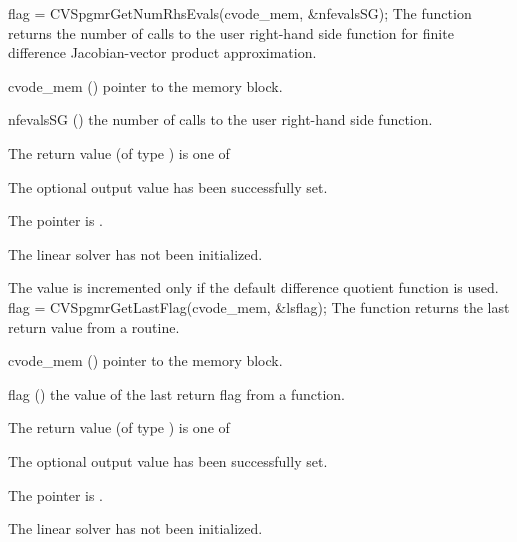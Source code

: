 {}
{
  flag = CVSpgmrGetNumRhsEvals(cvode\_mem, \&nfevalsSG);
}
{
  The function  returns the
  number of calls to the user right-hand side function for
  finite difference Jacobian-vector product approximation.
}
{
  \begin{args}
  \item[cvode\_mem] ()
    pointer to the {\cvode} memory block.
  \item[nfevalsSG] ()
    the number of calls to the user right-hand side function.
  \end{args}
}
{
  The return value  (of type ) is one of
  \begin{args}
  \item[\Id{CVSPGMR\_SUCCESS}] 
    The optional output value has been successfully set.
  \item[\Id{CVSPGMR\_MEM\_NULL}]
    The  pointer is .
  \item[\Id{CVSPGMR\_LMEM\_NULL}]
    The {\cvspgmr} linear solver has not been initialized.
  \end{args}
}
{
  The value  is incremented only if the default 
   difference quotient function is used.
}
{
  flag = CVSpgmrGetLastFlag(cvode\_mem, \&lsflag);
}
{
  The function  returns the
  last return value from a {\cvspgmr} routine. 
}
{
  \begin{args}
  \item[cvode\_mem] ()
    pointer to the {\cvode} memory block.
  \item[flag] ()
    the value of the last return flag from a {\cvspgmr} function.
  \end{args}
}
{
  The return value  (of type ) is one of
  \begin{args}
  \item[\Id{CVSPGMR\_SUCCESS}] 
    The optional output value has been successfully set.
  \item[\Id{CVSPGMR\_MEM\_NULL}]
    The  pointer is .
  \item[\Id{CVSPGMR\_LMEM\_NULL}]
    The {\cvspgmr} linear solver has not been initialized.
  \end{args}
}
